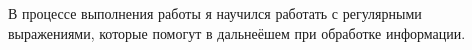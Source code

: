 В процессе выполнения работы я научился работать с регулярными выражениями, которые помогут в дальнеёшем при обработке информации.